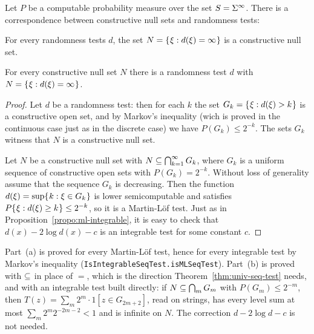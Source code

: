 \begin{theorem}
  \label{thm:g2.3.2}
  \leanok
  Let \( P \) be a computable probability measure
over the set \( S=\Sigma^{\infty} \).
There is a correspondence between constructive null sets and
randomness tests:
  \begin{alphenum}
    \item
  For every randomness tests \( d \), the set \( N=\mathopen\{\mskip 1mu\xi: d(\xi)=\infty\mskip 1mu\mathclose\} \) is a
  constructive null set.
    \item
For every constructive null set \( N \) there is a randomness test \( d \) with
\( N=\mathopen\{\mskip 1mu\xi: d(\xi)=\infty\mskip 1mu\mathclose\} \).
  \end{alphenum}
\end{theorem}
\begin{proof}
  \leanok
Let \( d \) be a randomness test: then for each \( k \) the set \( G_{k}=\mathopen\{\mskip 1mu\xi: d(\xi)>k\mskip 1mu\mathclose\} \) is a
constructive open set, and by Markov's inequality
(wich is proved in the continuous case just as in the discrete case)
 we have \( P(G_{k})\le 2^{-k} \).
The sets \( G_{k} \) witness that \( N \) is a constructive null set.

Let \( N \) be a constructive null set with \( N\subseteq \bigcap_{k=1}^{\infty} G_{k} \),
where \( G_{k} \) is a uniform sequence of constructive open sets with
\( P(G_{k})=2^{-k} \).
Without loss of generality assume that the sequence \( G_{k} \) is decreasing.
Then the function \( d(\xi)=\sup\mathopen\{\mskip 1mu k: \xi\in G_{k}\mskip 1mu\mathclose\} \) is lower semicomputable
and satisfies \( P\mathopen\{\mskip 1mu\xi:d(\xi)\ge k\mskip 1mu\mathclose\} \le 2^{-k} \), so it is a Martin-L\"of test.
Just as in Proposition~\ref{propo:ml-integrable},
it is easy to check that \( d(x)-2\log d(x) -c \) is an integrable test for some constant \( c \).
\end{proof}

\begin{formalization}
Part~(a) is proved for every Martin-L\"of test, hence for every integrable test by Markov's
inequality (\texttt{IsIntegrableSeqTest.isMLSeqTest}). Part~(b) is proved with \( \subseteq \) in
place of \( = \), which is the direction Theorem~\ref{thm:univ-seq-test} needs, and with an
integrable test built directly: if \( N \subseteq \bigcap_{m} G_{m} \) with
\( P(G_{m}) \le 2^{-m} \), then \( T(z) = \sum_{m} 2^{m} \cdot 1[z \in G_{2m+2}] \), read on
strings, has every level sum at most \( \sum_{m} 2^{m} 2^{-2m-2} < 1 \) and is infinite on
\( N \). The correction \( d - 2\log d - c \) is not needed.
\end{formalization}

